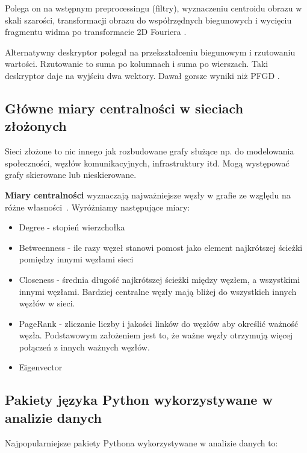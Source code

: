 \documentclass[wi]{zut}
\begin{document}
Polega on na wstępnym preprocessingu (filtry), wyznaczeniu centroidu obrazu w skali szarości, transformacji obrazu do współrzędnych biegunowych i wycięciu fragmentu widma po transformacie 2D Fouriera \cite{frejlichowski2015application}.

Alternatywny deskryptor polegał na przekształceniu biegunowym i rzutowaniu wartości. Rzutowanie to suma po kolumnach i suma po wierszach. Taki deskryptor daje na wyjściu dwa wektory. Dawał gorsze wyniki niż PFGD \cite{Frejlichowski2020_5}.


\subsection{Główne miary centralności w sieciach złożonych}

Sieci złożone to nic innego jak rozbudowane grafy służące np. do modelowania społeczności, węzłów komunikacyjnych, infrastruktury itd. Mogą występować grafy skierowane lub nieskierowane.

\textbf{Miary centralności} wyznaczają najważniejsze węzły w grafie ze względu na różne własności~\cite{Jankowski2020}. Wyróżniamy następujące miary:

\begin{itemize}
    \item Degree - stopień wierzchołka
    \item Betweenness - ile razy węzeł stanowi pomost jako element najkrótszej ścieżki pomiędzy innymi węzłami sieci
    \item Closeness - średnia długość najkrótszej ścieżki między węzłem, a wszystkimi innymi węzłami. Bardziej centralne węzły mają bliżej do wszystkich innych węzłów w sieci.
    \item PageRank - zliczanie liczby i jakości linków do węzłów aby określić ważność węzła. Podstawowym założeniem jest to, że ważne węzły otrzymują więcej połączeń z innych ważnych węzłów.
    \item Eigenvector
\end{itemize}

\subsection{Pakiety języka Python wykorzystywane w analizie danych}

Najpopularniejsze pakiety Pythona wykorzystywane w analizie danych to:
\end{document}
